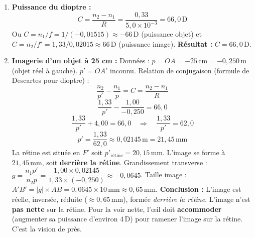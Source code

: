 \documentclass[11pt]{article}
\begin{document}
\begin{exoresolu}
\begin{enumerate}
    \item \textbf{Puissance du dioptre :}
    \[
    C = \frac{n_2 - n_1}{R} = \frac{0,33}{5,0 \times 10^{-3}} = 66,0\,\text{D}
    \]
    Ou $C = n_1/f = 1/(-0,01515) \approx -66\,\text{D}$ (puissance objet) et $C = n_2/f' = 1,33/0,02015 \approx 66\,\text{D}$ (puissance image).
    \textbf{Résultat :} $C = 66,0\,\text{D}$.

    \item \textbf{Imagerie d'un objet à 25 cm :}
    Données : $p = OA = -25\,\text{cm} = -0,250\,\text{m}$ (objet réel à gauche). $p' = OA'$ inconnu.
    Relation de conjugaison (formule de Descartes pour dioptre) :
    \[
    \frac{n_2}{p'} - \frac{n_1}{p} = C = \frac{n_2 - n_1}{R}
    \]
    \[
    \frac{1,33}{p'} - \frac{1,00}{-0,250} = 66,0
    \]
    \[
    \frac{1,33}{p'} + 4,00 = 66,0 \quad \Rightarrow \quad \frac{1,33}{p'} = 62,0
    \]
    \[
    p' = \frac{1,33}{62,0} \approx 0,02145\,\text{m} = 21,45\,\text{mm}
    \]
    La rétine est située en $F'$ soit $p'_{\text{rétine}} = 20,15\,\text{mm}$.
    L'image se forme à $21,45\,\text{mm}$, soit \textbf{derrière la rétine}.
    Grandissement transverse : $g = \dfrac{n_1 p'}{n_2 p} = \dfrac{1,00 \times 0,02145}{1,33 \times (-0,250)} \approx -0,0645$.
    Taille image : $A'B' = |g| \times AB = 0,0645 \times 10\,\text{mm} \approx 0,65\,\text{mm}$.
    \textbf{Conclusion :} L'image est réelle, inversée, réduite ($\approx 0,65\,\text{mm}$), formée \emph{derrière la rétine}. L'image n'est \textbf{pas nette} sur la rétine. Pour la voir nette, l'œil doit \textbf{accommoder} (augmenter sa puissance d'environ $4\,\text{D}$) pour ramener l'image sur la rétine. C'est la vision de près.
\end{enumerate}
\end{exoresolu}
\end{document}
